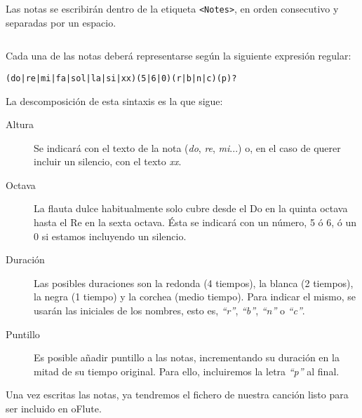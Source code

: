Las notas se escribirán dentro de la etiqueta \texttt{<Notes>}, en orden
consecutivo y separadas por un espacio.

\inputminted{xml}{apendice_manual_canciones/snippet_4}

Cada una de las notas deberá representarse según la siguiente expresión
regular:
\begin{verbatim}
(do|re|mi|fa|sol|la|si|xx)(5|6|0)(r|b|n|c)(p)?
\end{verbatim}

La descomposición de esta sintaxis es la que sigue:
\begin{description}
\item[Altura] Se indicará con el texto de la nota (\textit{do}, \textit{re},
  \textit{mi}...) o, en el caso de querer incluir un silencio, con el texto
  \textit{xx}.
\item[Octava] La flauta dulce habitualmente solo cubre desde el Do en la quinta
  octava hasta el Re en la sexta octava. Ésta se indicará con un número, 5 ó 6,
  ó un 0 si estamos incluyendo un silencio.
\item[Duración] Las posibles duraciones son la redonda (4 tiempos), la blanca (2
  tiempos), la negra (1 tiempo) y la corchea (medio tiempo). Para indicar el
  mismo, se usarán las iniciales de los nombres, esto es, \textit{``r''},
  \textit{``b''}, \textit{``n''} o \textit{``c''}.
\item[Puntillo] Es posible añadir puntillo a las notas, incrementando su
  duración en la mitad de su tiempo original. Para ello, incluiremos la letra
  \textit{``p''} al final.
\end{description}

Una vez escritas las notas, ya tendremos el fichero de nuestra canción listo
para ser incluido en oFlute.


